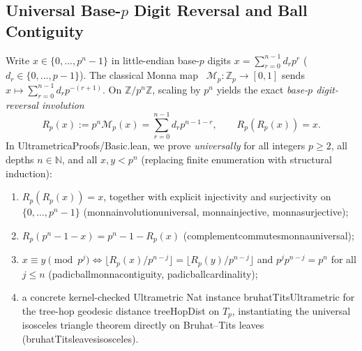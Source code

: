 \documentclass[11pt,a4paper]{article}
\numberwithin{equation}{section}
\theoremstyle{plain}
\theoremstyle{definition}
\theoremstyle{remark}
\newcommand{\N}{\mathbb{N}}
\newcommand{\Z}{\mathbb{Z}}
\newcommand{\Zp}{\mathbb{Z}_p}
\newcommand{\Tp}{T_p}
\newcommand{\code}[1]{{\ttfamily\footnotesize\def\_{\textunderscore\penalty0\hskip0pt}#1}}
\begin{document}
\subsection{Universal Base-\texorpdfstring{$p$}{p} Digit Reversal and Ball Contiguity}
Write $x \in \{0,\dots,p^n - 1\}$ in little-endian base-$p$ digits $x = \sum_{r=0}^{n-1} d_r p^r$ ($d_r \in \{0,\dots,p-1\}$). The classical Monna map~\cite{Monna1970} $\mathcal{M}_p : \Zp \to [0,1]$ sends $x \mapsto \sum_{r=0}^{n-1} d_r p^{-(r+1)}$. On $\Z / p^n\Z$, scaling by $p^n$ yields the exact \emph{base-$p$ digit-reversal involution}
\begin{equation}
  R_p(x) := p^n \mathcal{M}_p(x) = \sum_{r=0}^{n-1} d_r p^{n-1-r}, \qquad R_p(R_p(x)) = x.
  \label{eq:monna-inv}
\end{equation}
In \code{UltrametricaProofs/Basic.lean}, we prove \emph{universally} for all integers $p \ge 2$, all depths $n \in \N$, and all $x, y < p^n$ (replacing finite enumeration with structural induction):
\begin{enumerate}[leftmargin=1.8em,itemsep=1pt]
  \item $R_p(R_p(x)) = x$, together with explicit injectivity and surjectivity on $\{0,\dots,p^n-1\}$ (\code{monna\_involution\_universal}, \code{monna\_injective}, \code{monna\_surjective});
  \item $R_p(p^n - 1 - x) = p^n - 1 - R_p(x)$ (\code{complement\_commutes\_monna\_universal});
  \item $x \equiv y \pmod{p^j} \iff \lfloor R_p(x) / p^{n-j} \rfloor = \lfloor R_p(y) / p^{n-j} \rfloor$ and $p^j p^{n-j} = p^n$ for all $j \le n$ (\code{padic\_ball\_monna\_contiguity}, \code{padic\_ball\_cardinality});
  \item a concrete kernel-checked \code{Ultrametric Nat} instance \code{bruhatTitsUltrametric} for the tree-hop geodesic distance \code{treeHopDist} on $\Tp$, instantiating the universal isosceles triangle theorem directly on Bruhat--Tits leaves (\code{bruhatTits\_leaves\_isosceles}).
\end{enumerate}
\end{document}
